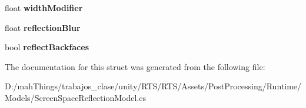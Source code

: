 \begin{DoxyCompactItemize}
float {\bfseries width\+Modifier}
\item 
\mbox{\label{struct_unity_engine_1_1_post_processing_1_1_screen_space_reflection_model_1_1_reflection_settings_a5d0f0e42f7a47b7054f09add92c5a1d4}} 
float {\bfseries reflection\+Blur}
\item 
\mbox{\label{struct_unity_engine_1_1_post_processing_1_1_screen_space_reflection_model_1_1_reflection_settings_aea5f2791fe328b408dca33c78e741dd4}} 
bool {\bfseries reflect\+Backfaces}
\end{DoxyCompactItemize}


The documentation for this struct was generated from the following file\+:\begin{DoxyCompactItemize}
\item 
D\+:/mah\+Things/trabajos\+\_\+clase/unity/\+R\+T\+S/\+R\+T\+S/\+Assets/\+Post\+Processing/\+Runtime/\+Models/Screen\+Space\+Reflection\+Model.\+cs\end{DoxyCompactItemize}
